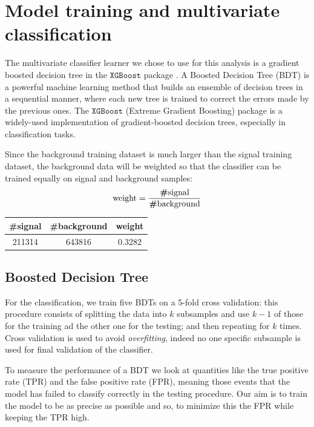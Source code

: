 
\section{Model training and multivariate classification}

The multivariate classifier learner we chose to use for this analysis is a gradient boosted decision tree in the $\texttt{XGBoost}$ package \cite{Chen}. A Boosted Decision Tree (BDT) is a powerful machine learning method that builds an ensemble of decision trees in a sequential manner, where each new tree is trained to correct the errors made by the previous ones. The $\texttt{XGBoost}$ (Extreme Gradient Boosting) package is a widely-used implementation of gradient-boosted decision trees, especially in classification tasks.

Since the background training dataset is much larger than the signal training dataset, the background data will be weighted so that the classifier can be trained equally on signal and background samples:
\[
\text{weight}=\frac{\text{\textbf{\#}signal}}{\text{\textbf{\#}background}}
\]

\begin{center}
\begin{tabular}{||c c c||} 
 \hline
 \textbf{\#}signal & \textbf{\#}background & weight \\ [0.5ex] 
 \hline
 211314 & 643816 & 0.3282 \\ 
 \hline
\end{tabular}
\end{center}

\subsection{Boosted Decision Tree}

For the classification, we train five BDTs on a 5-fold cross validation: this procedure consists of splitting the data into $k$ subsamples and use $k-1$ of those for the training ad the other one for the testing; and then repeating for $k$ times. Cross validation is used to avoid \emph{overfitting}, indeed no one specific subsample is used for final validation of the classifier.

To measure the performance of a BDT we look at quantities like the true positive rate (TPR) and the false positive rate (FPR), meaning those events that the model has failed to classify correctly in the testing procedure. Our aim is to train the model to be as precise as possible and so, to minimize this the FPR while keeping the TPR high.

